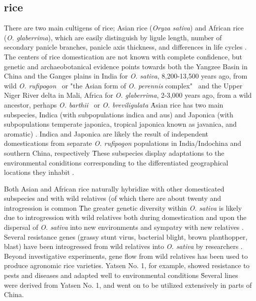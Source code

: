 \documentclass[11pt]{article}
\begin{document}
\subsection*{rice}

There are two main cultigens of rice; Asian rice (\emph{Oryza sativa}) and African rice (\emph{O. glaberrima}), which are easily distinguish by ligule length, number of secondary panicle branches, panicle axis thickness, and differences in life cycles \cite{oka2012origin}.
The centers of rice domestication are not known with complete confidence, but genetic and archaeobotanical evidence points towards both the Yangzee Basin in China and the Ganges plains in India for \emph{O. sativa}, 8,200-13,500 years ago, from wild \emph{O. rufipogon}  \cite{oka2012origin, fuller2010consilience, ricepedia, molina2011molecular}\ or "the Asian form of \emph{O. perennis} complex" \cite{oka2012origin}\ and the Upper Niger River delta in Mali, Africa for \emph{O. glaberrima}, 2-3,000 years ago, from a wild ancestor, perhaps \emph{O. barthii} \cite{ricepedia}\ or \emph{O. breviligulata} \cite{oka2012origin}\.
Asian rice has two main subspecies, Indica (with subpopulations indica and aus) and Japonica (with subpopulations temperate japonica, tropical japonica known as javanica, and aromatic) \cite{chang2003origin, glaszmann1987isozymes, ricepedia}.
Indica and Japonica are likely the result of independent domestications from separate \emph{O. rufipogon} populations in India/Indochina and southern China, respectively \cite{londo2006phylogeography}\.
These subspecies display adaptations to the environmental coniditions corresponding to the differentiated geographical locations they inhabit \cite{khush2003classifying}.

Both Asian and African rice naturally hybridize with other domesticated subspecies and with wild relatives (of which there are about twenty \cite{ricepedia} and introgression is common \cite{oka2012origin, second1982origin, zhao2010genomic}\.
The greater genetic diversity within \emph{O. sativa} is likely due to introgression with wild relatives both during domestication and upon the dispersal of \emph{O. sativa} into new environments and sympatry with new relatives \cite{second1982origin}.
Several resistance genes (grassy stunt virus, bacterial blight, brown planthopper, blast) have been introgressed from wild relatives into \emph{O. sativa} by researchers \cite{brar1997alien, khush1974inheritance}.
Beyond investigative experiments, gene flow from wild relatives has been used to produce agronomic rice varieties.
Yatsen No. 1, for example, showed resistance to pests and diseases and adapted well to environmental conditions \cite{ting1933wild}\.
Several lines were derived from Yatsen No. 1, and went on to be utilized extensively in parts of China.
\end{document}
